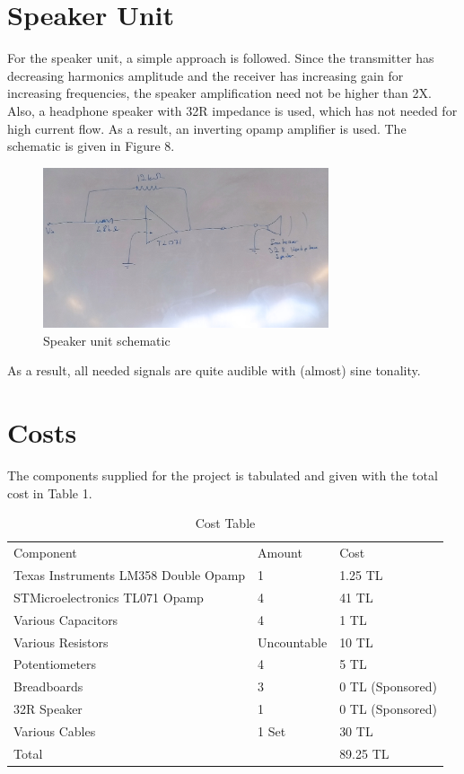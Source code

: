 \documentclass[letterpaper,12pt]{article}
\begin{document}
\section{Speaker Unit}
For the speaker unit, a simple approach is followed. Since the transmitter has decreasing harmonics amplitude and the receiver has increasing gain for increasing frequencies, the speaker amplification need not be higher than 2X. Also, a headphone speaker with 32R impedance is used, which has not needed for high current flow. As a result, an inverting opamp amplifier is used. The schematic is given in Figure 8.
\begin{figure}[H]
    \centering
    \includegraphics[width = 0.75\textwidth]{speaker_schematic.jpg}
    \caption{Speaker unit schematic}
\end{figure}

As a result, all needed signals are quite audible with (almost) sine tonality. 
\section{Costs}
The components supplied for the project is tabulated and given with the total cost in Table 1.
\begin{table}[H]
    \centering
    \begin{tabular}{||l|l|l||}
    Component                            & Amount      & Cost             \\
    Texas Instruments LM358 Double Opamp & 1           & 1.25 TL          \\
    STMicroelectronics TL071 Opamp       & 4           & 41 TL            \\
    Various Capacitors                   & 4           & 1 TL             \\
    Various Resistors                    & Uncountable & 10 TL            \\
    Potentiometers                       & 4           & 5 TL             \\
    Breadboards                          & 3           & 0 TL (Sponsored) \\
    32R Speaker                          & 1           & 0 TL (Sponsored) \\
    Various Cables                       & 1 Set       & 30 TL            \\
    Total                                &             & 89.25 TL        
    \end{tabular}
    \caption{Cost Table}
    \label{tab:my-table}
    \end{table}
    
\end{document}
